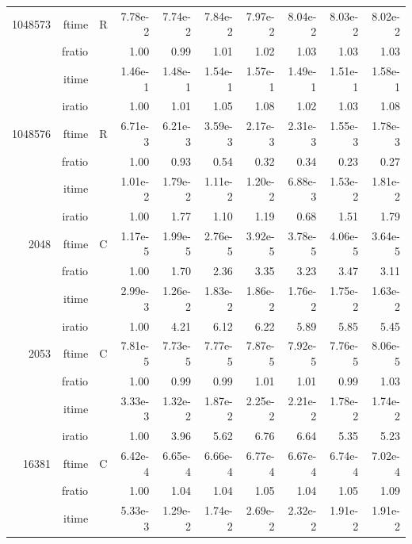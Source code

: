 \documentclass[a4paper]{article}
\begin{document}
\begin{table}[htbp]
\begin{center}
\begin{small}
\begin{tabular}{|r|r|r|r|r|r|r|r|r|r|}
  1048573  & ftime & R &    7.78e-2 &   7.74e-2 &   7.84e-2 &   7.97e-2 &   8.04e-2 &   8.03e-2 &   8.02e-2    \\ 
      & fratio & &  1.00 &   0.99 &   1.01 &   1.02 &   1.03 &   1.03 &   1.03    \\ 
     & itime & &   1.46e-1 &   1.48e-1 &   1.54e-1 &   1.57e-1 &   1.49e-1 &   1.51e-1 &   1.58e-1    \\ 
     & iratio & &   1.00 &   1.01 &   1.05 &   1.08 &   1.02 &   1.03 &   1.08    \\ \hline 
 1048576  & ftime & R &  6.71e-3 &   6.21e-3 &   3.59e-3 &   2.17e-3 &   2.31e-3 &   1.55e-3 &   1.78e-3   \\ 
      & fratio & & 1.00 &   0.93 &   0.54 &   0.32 &   0.34 &   0.23 &   0.27  \\
     & itime & & 1.01e-2 &   1.79e-2 &   1.11e-2 &   1.20e-2 &   6.88e-3 &   1.53e-2 &   1.81e-2    \\ 
 & iratio & &  1.00 &   1.77 &   1.10 &   1.19 &   0.68 &   1.51 &   1.79   \\  \hline \hline
    2048  & ftime & C  &  1.17e-5 &   1.99e-5 &   2.76e-5 &   3.92e-5 &   3.78e-5 &   4.06e-5 &   3.64e-5   \\ 
      & fratio & &  1.00 &   1.70 &   2.36 &   3.35 &   3.23 &   3.47 &   3.11   \\ 
     & itime & &  2.99e-3 &   1.26e-2 &   1.83e-2 &   1.86e-2 &   1.76e-2 &   1.75e-2 &   1.63e-2   \\ 
     & iratio & &  1.00 &   4.21 &   6.12 &   6.22 &   5.89 &   5.85 &   5.45    \\ \hline 
    2053  & ftime & C &  7.81e-5 &   7.73e-5 &   7.77e-5 &   7.87e-5 &   7.92e-5 &   7.76e-5 &   8.06e-5     \\ 
      & fratio & & 1.00 &   0.99 &   0.99 &   1.01 &   1.01 &   0.99 &   1.03    \\ 
     & itime &  & 3.33e-3 &   1.32e-2 &   1.87e-2 &   2.25e-2 &   2.21e-2 &   1.78e-2 &   1.74e-2    \\ 
    & iratio &  &    1.00 &   3.96 &   5.62 &   6.76 &   6.64 &   5.35 &   5.23     \\ \hline
  16381  & ftime & C &    6.42e-4 &   6.65e-4 &   6.66e-4 &   6.77e-4 &   6.67e-4 &   6.74e-4 &   7.02e-4     \\ 
      & fratio & & 1.00 &   1.04 &   1.04 &   1.05 &   1.04 &   1.05 &   1.09    \\ 
     & itime & &    5.33e-3 &   1.29e-2 &   1.74e-2 &   2.69e-2 &   2.32e-2 &   1.91e-2 &   1.91e-2    \\ 

\end{tabular}
\end{small}
\end{center}
\end{table}
\end{document}
